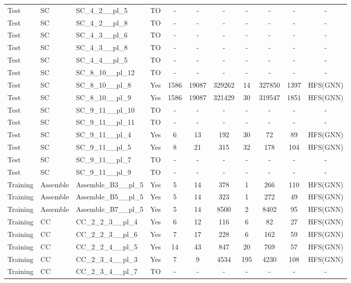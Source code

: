 \documentclass{article}
\begin{document}
\begin{tabular}{lllcccccccc}
Test & SC & SC\_4\_2\_\_pl\_5 & TO & - & - & - & - & - & - & - \\
Test & SC & SC\_4\_2\_\_pl\_8 & TO & - & - & - & - & - & - & - \\
Test & SC & SC\_4\_3\_\_pl\_6 & TO & - & - & - & - & - & - & - \\
Test & SC & SC\_4\_3\_\_pl\_8 & TO & - & - & - & - & - & - & - \\
Test & SC & SC\_4\_4\_\_pl\_5 & TO & - & - & - & - & - & - & - \\
Test & SC & SC\_8\_10\_\_pl\_12 & TO & - & - & - & - & - & - & - \\
Test & SC & SC\_8\_10\_\_pl\_8 & Yes & 1586 & 19087 & 329262 & 14 & 327850 & 1397 & HFS(GNN) \\
Test & SC & SC\_8\_10\_\_pl\_9 & Yes & 1586 & 19087 & 321429 & 30 & 319547 & 1851 & HFS(GNN) \\
Test & SC & SC\_9\_11\_\_pl\_10 & TO & - & - & - & - & - & - & - \\
Test & SC & SC\_9\_11\_\_pl\_11 & TO & - & - & - & - & - & - & - \\
Test & SC & SC\_9\_11\_\_pl\_4 & Yes & 6 & 13 & 192 & 30 & 72 & 89 & HFS(GNN) \\
Test & SC & SC\_9\_11\_\_pl\_5 & Yes & 8 & 21 & 315 & 32 & 178 & 104 & HFS(GNN) \\
Test & SC & SC\_9\_11\_\_pl\_7 & TO & - & - & - & - & - & - & - \\
Test & SC & SC\_9\_11\_\_pl\_9 & TO & - & - & - & - & - & - & - \\
Training & Assemble & Assemble\_B3\_\_pl\_5 & Yes & 5 & 14 & 378 & 1 & 266 & 110 & HFS(GNN) \\
Training & Assemble & Assemble\_B5\_\_pl\_5 & Yes & 5 & 14 & 323 & 1 & 272 & 49 & HFS(GNN) \\
Training & Assemble & Assemble\_B7\_\_pl\_5 & Yes & 5 & 14 & 8500 & 2 & 8402 & 95 & HFS(GNN) \\
Training & CC & CC\_2\_2\_3\_\_pl\_4 & Yes & 6 & 12 & 116 & 6 & 82 & 27 & HFS(GNN) \\
Training & CC & CC\_2\_2\_3\_\_pl\_6 & Yes & 7 & 17 & 228 & 6 & 162 & 59 & HFS(GNN) \\
Training & CC & CC\_2\_2\_4\_\_pl\_5 & Yes & 14 & 43 & 847 & 20 & 769 & 57 & HFS(GNN) \\
Training & CC & CC\_2\_3\_4\_\_pl\_3 & Yes & 7 & 9 & 4534 & 195 & 4230 & 108 & HFS(GNN) \\
Training & CC & CC\_2\_3\_4\_\_pl\_7 & TO & - & - & - & - & - & - & - \\

\end{tabular}
\end{document}
